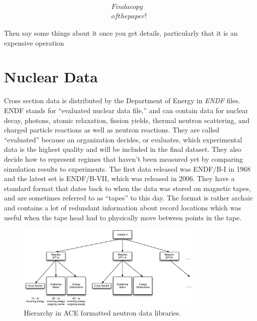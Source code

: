 \begin{equation}
\begin{split}
Find a copy\\
of the paper!
 \end{split}
\label{broaden_kernel}
\end{equation}

Then say some things about it once you get details, particularly that it is an expensive operation

\section{Nuclear Data}

Cross section data is distributed by the Department of Energy in \emph{ENDF} files.  ENDF stands for ``evaluated nuclear data file,'' and can contain data for nuclear decay, photons, atomic relaxation, fission yields, thermal neutron scattering, and charged particle reactions as well as neutron reactions.  They are called ``evaluated'' because an organization decides, or evaluates, which experimental data is the highest quality and will be included in the final dataset.  They also decide how to represent regimes that haven't been measured yet by comparing simulation results to experiments.   The first data released was ENDF/B-I in 1968 and the latest set is ENDF/B-VII, which was released in 2006.  They have a standard format that dates back to when the data was stored on magnetic tapes, and are sometimes referred to as ``tapes'' to this day.  The format is rather archaic and contains a lot of redundant information about record locations which was useful when the tape head had to physically move between points in the tape.  

\begin{figure}[h!]
  \centering
    \includegraphics[width=0.8\textwidth]{graphics/data_levels.eps}
     \caption{Hierarchy in ACE formatted neutron data libraries.  \label{data_levels}}
\end{figure}

